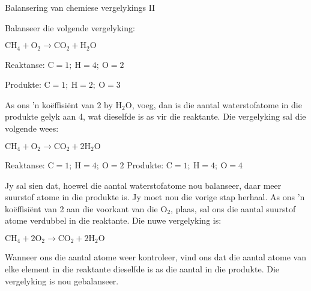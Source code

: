\begin{wex}{Balansering van chemiese vergelykings II}{Balanseer die volgende vergelyking:
\begin{center}
${\text{CH}_{4} + \text{O}_{2} \rightarrow \text{CO}_{2} + \text{H}_{2}\text{O}}$
\end{center}
}
{

Reaktanse: $\text{C} = 1;~ \text{H} = 4;~ \text{O} = 2$

Produkte: $\text{C} = 1;~ \text{H} = 2;~ \text{O} = 3$


As ons 'n koëffisiënt van 2 by $\text{H}_{2}\text{O}$, voeg, dan is die aantal waterstofatome in die produkte gelyk aan  4, wat   dieselfde is  as vir die reaktante. Die vergelyking sal die volgende wees:

\begin{center}
${\text{CH}_{4} + \text{O}_{2} \rightarrow \text{CO}_{2} + 2\text{H}_{2}\text{O}}$\\
\end{center}


Reaktanse: $\text{C} = 1;~ \text{H} = 4;~ \text{O} = 2$
Produkte: $\text{C} = 1;~ \text{H} = 4; ~\text{O} = 4$

Jy sal sien dat, hoewel die aantal waterstofatome nou balanseer, daar meer suurstof atome in die produkte is. Jy moet nou die vorige stap herhaal. As ons 'n koëffisiënt van 2 aan die voorkant van die $\text{O}_{2}$, plaas, sal ons die aantal suurstof atome verdubbel in die reaktante. Die nuwe vergelyking is:
\begin{center}
${\text{CH}_{4} + 2\text{O}_{2} \rightarrow \text{CO}_{2} + 2\text{H}_{2}\text{O}}$
\end{center}
Wanneer ons die aantal atome weer kontroleer, vind ons dat die aantal atome van elke element in die reaktante dieselfde is as die aantal in die produkte. Die vergelyking is nou gebalanseer.
}
\end{wex}
    \noindent
\label{m38726*secfhsst!!!underscore!!!id501}
      \noindent
\par
            \label{m38726*secfhsst!!!underscore!!!id590} 
      \noindent
